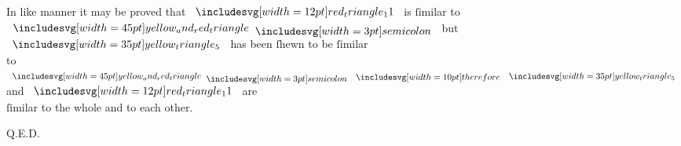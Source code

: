 \documentclass[11pt,preview]{standalone}
\begin{document}
\begin{center}
    In like manner it may be proved that $\img[0][0][12]{red_triangle_11}$ is ſimilar to\\
    $\img[0][0][45]{yellow_and_red_triangle} \bsemicolon$ but $\img[0][0][35]{yellow_triangle_5}$ has been ſhewn to be ſimilar\\
    to $\img[0][0][45]{yellow_and_red_triangle} \bsemicolon \btherefore \img[0][0][35]{yellow_triangle_5}$ and $\img[0][0][12]{red_triangle_11}$ are\\
    ſimilar to the whole and to each other.
\end{center}

\hfill

\hfill Q.E.D.
\end{document}
